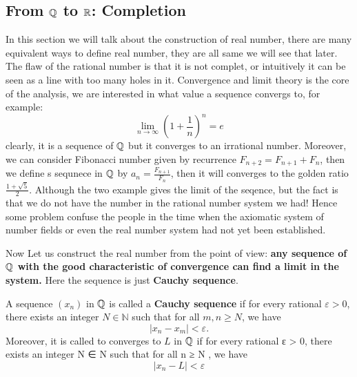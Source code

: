 \documentclass[en,geye,blue,pc,12pt]{elegantnote}
\begin{document}
\subsection{From \texorpdfstring{$\mathbb{Q}$}{TEXT} to \texorpdfstring{$\mathbb{R}$}{TEXT}: Completion}
In this section we will talk about the construction of real number, there are many equivalent ways to define real number, they are all same we will see that later. The flaw of the rational number is that it is not complet, or intuitively it can be seen as a line with too many holes in it. Convergence and limit theory is the core of the analysis, we are interested in what value a sequence convergs to, for example:
\[\lim_{n \rightarrow \infty} (1+\frac{1}{n})^n =e\]
clearly, it is a sequence of \(\mathbb{Q}\) but it converges to an irrational number. Moreover, we can consider Fibonacci number given by recurrence \(F_{n+2} = F_{n+1} + F_{n}\), then we define s sequnece in \(\mathbb{Q}\) by \(a_n = \frac{F_{n+1}}{F_n}\), then it will converges to the golden ratio \(\frac{1+\sqrt{5}}{2}\).
Although the two example gives the limit of the seqence, but the fact is that we do not have the number in the rational number system we had! Hence some problem confuse the people in the time when the axiomatic system of number fields or even the real number system had not yet been established. 

Now Let us construct the real number from the point of view: \textbf{any sequence of \(\mathbb{Q}\) with the good characteristic of convergence can find a limit in the system.} Here the sequence is just \textbf{Cauchy sequence}.
\begin{definition}
  A sequence \((x_n)\) in \(\mathbb{\mathbb{Q}}\) is called a \textbf{Cauchy sequence} if for every rational \(\varepsilon > 0\), there exists an integer \(N \in \mathbb{N}\) such that for all \(m, n \geq N\), we have
\[
|x_n - x_m| < \varepsilon.
\]
Moreover, it is called to converges to \(L\) in \(\mathbb{Q}\) if for every rational
ε > 0, there exists an integer N ∈ N such that for all  n ≥ N , we have
\[|x_n-L| < \varepsilon\]
\end{definition}
\end{document}
